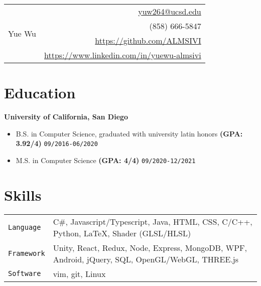 \documentclass[10pt, letterpaper]{article}
\begin{document}
	\begin{tabularx}{\linewidth}{X r}
		\multirow{5}{*}{{\fontsize{50}{60}\selectfont Yue Wu}}
		& \href{mailto:yuw264@ucsd.edu}{yuw264@ucsd.edu} \\
		& (858) 666-5847 \\
		& \href{https://github.com/ALMSIVI}{https://github.com/ALMSIVI} \\
		& \href{https://www.linkedin.com/in/yuewu-almsivi}{https://www.linkedin.com/in/yuewu-almsivi}
	\end{tabularx}
	\section{Education}
	\smallskip
	\textbf{\large University of California, San Diego}
	\begin{itemize}
		\item B.S. in Computer Science, graduated with university latin honors \textbf{(GPA: 3.92/4)} \hfill \texttt{09/2016-06/2020}
		\item M.S. in Computer Science \textbf{(GPA: 4/4)} \hfill \texttt{09/2020-12/2021}
	\end{itemize}
	\section{Skills}
	\smallskip
	\begin{tabularx}{\linewidth}{l X}
		\texttt{Language} & C\#, Javascript/Typescript, Java, HTML, CSS, C/C++, Python, \LaTeX, Shader (GLSL/HLSL) \\
		\texttt{Framework} & Unity, React, Redux, Node, Express, MongoDB, WPF, Android, jQuery, SQL, OpenGL/WebGL, THREE.js \\
		\texttt{Software} & vim, git, Linux
	\end{tabularx}
\end{document}
